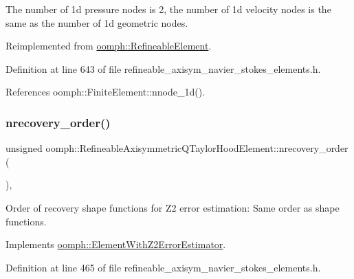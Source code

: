 The number of 1d pressure nodes is 2, the number of 1d velocity nodes is the same as the number of 1d geometric nodes. 



Reimplemented from \hyperlink{classoomph_1_1RefineableElement_a850180084aaf164550b4f4978b42cda7}{oomph\+::\+Refineable\+Element}.



Definition at line 643 of file refineable\+\_\+axisym\+\_\+navier\+\_\+stokes\+\_\+elements.\+h.



References oomph\+::\+Finite\+Element\+::nnode\+\_\+1d().

\mbox{\label{classoomph_1_1RefineableAxisymmetricQTaylorHoodElement_a76415a2111375cf4b88cea3b2ade9c68}} 
\subsubsection{\texorpdfstring{nrecovery\+\_\+order()}{nrecovery\_order()}}
{\footnotesize\ttfamily unsigned oomph\+::\+Refineable\+Axisymmetric\+Q\+Taylor\+Hood\+Element\+::nrecovery\+\_\+order (\begin{DoxyParamCaption}{ }\end{DoxyParamCaption})\hspace{0.3cm}{\ttfamily [inline]}, {\ttfamily [virtual]}}



Order of recovery shape functions for Z2 error estimation\+: Same order as shape functions. 



Implements \hyperlink{classoomph_1_1ElementWithZ2ErrorEstimator_af39480835bd3e0f6b2f4f7a9a4044798}{oomph\+::\+Element\+With\+Z2\+Error\+Estimator}.



Definition at line 465 of file refineable\+\_\+axisym\+\_\+navier\+\_\+stokes\+\_\+elements.\+h.

\mbox{\label{classoomph_1_1RefineableAxisymmetricQTaylorHoodElement_ae60cce9a7c941a9e82ef31d1da23908b}} 

